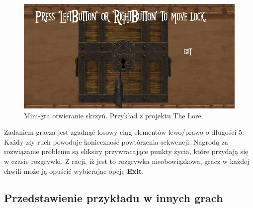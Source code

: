 \documentclass[oneside,polski,logo]{amuthesis}
\begin{document}
\begin{figure}[h]
	\centering
	\includegraphics[width=12cm]{images/tyrek/minigraskrzynia.png}
	\caption{Mini-gra otwieranie skrzyń. Przykład z projektu The Lore}
\end{figure}

Zadaniem gracza jest zgadnąć losowy ciąg elementów lewo/prawo o długości 5. Każdy zły ruch powoduje konieczność powtórzenia sekwencji. Nagrodą za rozwiązanie problemu są eliksiry przywracające punkty życia, które przydają się w czasie rozgrywki. Z racji, iż jest to rozgrywka nieobowiązkowa, gracz w każdej chwili może ją opuścić wybierając opcję \textbf{Exit}.
\subsection{Przedstawienie przykładu w innych grach}
\end{document}
